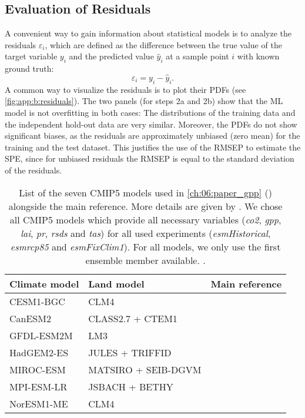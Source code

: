 \subsection{Evaluation of Residuals}
\label{subsec:app:b:residuals}

A convenient way to gain information about statistical models is to analyze the
residuals $\varepsilon_i$, which are defined as the difference between the true
value of the target variable $y_i$ and the predicted value $\hat{y}_i$ at a
sample point $i$ with known ground truth:
\begin{equation}
  \varepsilon_i = y_i - \hat{y}_i.
  \label{eq:app:b:residuals}
\end{equation}
A common way to visualize the residuals is to plot their \acfp{PDF} (see
\cref{fig:app:b:residuals}). The two panels (for steps 2a and 2b) show that the
\ac{ML} model is not overfitting in both cases: The distributions of the
training data and the independent hold-out data are very similar. Moreover, the
\acp{PDF} do not show significant biases, as the residuals are approximately
unbiased (zero mean) for the training and the test dataset. This justifies the
use of the \ac{RMSEP} to estimate the \ac{SPE}, since for unbiased residuals
the \ac{RMSEP} is equal to the standard deviation of the residuals.

\begin{table}[p]
  \centering
  \begin{tabulary}{\columnwidth}{L L L}
    \toprule
    Climate model & Land model & Main reference \\
    \midrule
    CESM1-BGC & CLM4 & \textcite{Gent2011} \\
    CanESM2 & CLASS2.7 + CTEM1 & \textcite{Arora2011} \\
    GFDL-ESM2M & LM3 & \textcite{Dunne2012} \\
    HadGEM2-ES & JULES + TRIFFID & \textcite{Collins2011} \\
    MIROC-ESM & MATSIRO + SEIB-DGVM & \textcite{Watanabe2011} \\
    MPI-ESM-LR & JSBACH + BETHY & \textcite{Giorgetta2013} \\
    NorESM1-ME & CLM4 & \textcite{Iversen2013} \\
    \bottomrule
  \end{tabulary}
  \caption{List of the seven \acs{CMIP}5 models used in \cref{ch:06:paper_gpp}
    () alongside the main reference. More details are
    given by \textcite{Anav2013}. We chose all \acs{CMIP}5 models which provide
    all necessary variables (\emph{co2}, \emph{gpp}, \emph{lai}, \emph{pr},
    \emph{rsds} and \emph{tas}) for all used experiments (\emph{esmHistorical},
    \emph{esmrcp85} and \emph{esmFixClim1}). For all models, we only use the
    first ensemble member available. .}
  \label{tab:app:b:cmip5_models}
\end{table}

